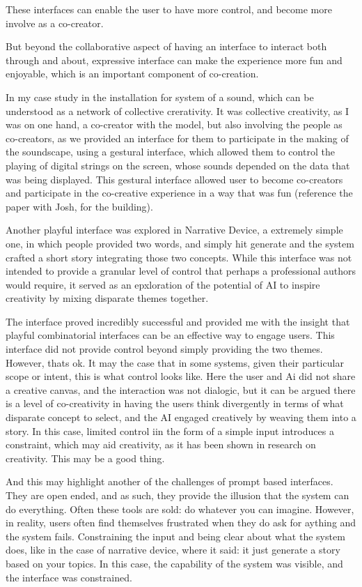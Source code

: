 These interfaces can enable the user to have more control, and become more involve as a co-creator. 

But beyond the collaborative aspect of having an interface to interact both through and about, expressive interface can make the experience more fun and enjoyable, which is an important component of co-creation. 

In my case study in the installation for system of a sound, which can be understood as a network of collective crerativity. It was collective creativity, as I was on one hand, a co-creator with the model, but also involving the people as co-creators, as we provided an interface for them to participate in the making of the soundscape, using a gestural interface, which allowed them to control the playing of digital strings on the screen, whose sounds depended on the data that was being displayed. This gestural interface allowed user to become co-creators and participate in the co-creative experience in a way that was fun (reference the paper with Josh, for the building). 

Another playful interface was explored in Narrative Device, a extremely simple one, in which people provided two words, and simply hit generate and the system crafted a short story integrating those two concepts. While this interface was not intended to provide a granular level of control that perhaps a professional authors would require, it served as an epxloration of the potential of AI to inspire creativity by mixing disparate themes together. 

The interface proved incredibly successful and provided me with the insight that playful combinatorial interfaces can be an effective way to engage users. This interface did not provide control beyond simply providing the two themes. However, thats ok. It may the case that in some systems, given their particular scope or intent, this is what control looks like. Here the user and Ai did not share a creative canvas, and the interaction was not dialogic, but it can be argued there is a level of co-creativity in having the users think divergently in terms of what disparate concept to select, and the AI engaged creatively by weaving them into a story. In this case, limited control iin the form of a simple input introduces a constraint, which may aid creativity, as it has been shown in research on creativity. This may be a good thing. 

And this may highlight another of the challenges of prompt based interfaces. They are open ended, and as such, they provide the illusion that the system can do everything. Often these tools are sold: do whatever you can imagine. However, in reality, users often find themselves frustrated when they do ask for aything and the system fails. Constraining the input and being clear about what the system does, like in the case of narrative device, where it said: it just generate a story based on your topics. In this case, the capability of the system was visible, and the interface was constrained. 


